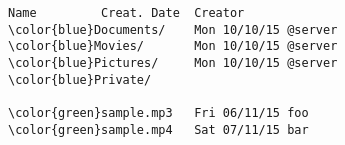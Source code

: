 \begin{Verbatim}[commandchars=\\\{\},codes={\catcode`$=3\catcode`^=7\catcode`_=8},frame=single]
Name         Creat. Date  Creator
\color{blue}Documents/    Mon 10/10/15 @server
\color{blue}Movies/       Mon 10/10/15 @server
\color{blue}Pictures/     Mon 10/10/15 @server
\color{blue}Private/

\color{green}sample.mp3   Fri 06/11/15 foo
\color{green}sample.mp4   Sat 07/11/15 bar
\end{Verbatim}
